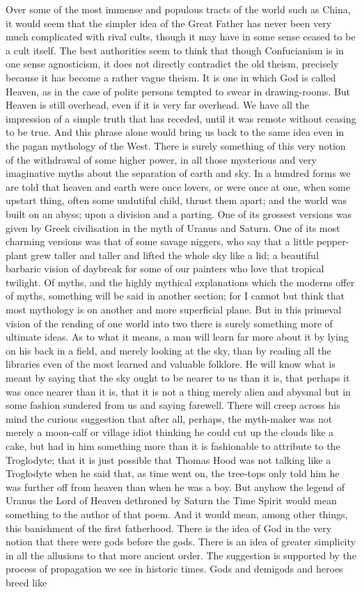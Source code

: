 Over some of the most immense and populous tracts of the world such as China, it would seem that the simpler idea of the Great Father has never been very much complicated with rival cults, though it may have in some sense ceased to be a cult itself. The best authorities seem to think that though Confucianism is in one sense agnosticism, it does not directly contradict the old theism, precisely because it has become a rather vague theism. It is one in which God is called Heaven, as in the case of polite persons tempted to swear in drawing-rooms. But Heaven is still overhead, even if it is very far overhead. We have all the impression of a simple truth that has receded, until it was remote without ceasing to be true. And this phrase alone would bring us back to the same idea even in the pagan mythology of the West. There is surely something of this very notion of the withdrawal of some higher power, in all those mysterious and very imaginative myths about the separation of earth and sky. In a hundred forms we are told that heaven and earth were once lovers, or were once at one, when some upstart thing, often some undutiful child, thrust them apart; and the world was built on an abyss; upon a division and a parting. One of its grossest versions was given by Greek civilisation in the myth of Uranus and Saturn. One of its most charming versions was that of some savage niggers, who say that a little pepper-plant grew taller and taller and lifted the whole sky like a lid; a beautiful barbaric vision of daybreak for some of our painters who love that tropical twilight. Of myths, and the highly mythical explanations which the moderns offer of myths, something will be said in another section; for I cannot but think that most mythology is on another and more superficial plane. But in this primeval vision of the rending of one world into two there is surely something more of ultimate ideas. As to what it means, a man will learn far more about it by lying on his back in a field, and merely looking at the sky, than by reading all the libraries even of the most learned and valuable folklore. He will know what is meant by saying that the sky ought to be nearer to us than it is, that perhaps it was once nearer than it is, that it is not a thing merely alien and abysmal but in some fashion sundered from us and saying farewell. There will creep across his mind the curious suggestion that after all, perhaps, the myth-maker was not merely a moon-calf or village idiot thinking he could cut up the clouds like a cake, but had in him something more than it is fashionable to attribute to the Troglodyte; that it is just possible that Thomas Hood was not talking like a Troglodyte when he said that, as time went on, the tree-tops only told him he was further off from heaven than when he was a boy. But anyhow the legend of Uranus the Lord of Heaven dethroned by Saturn the Time Spirit would mean something to the author of that poem. And it would mean, among other things, this banishment of the first fatherhood. There is the idea of God in the very notion that there were gods before the gods. There is an idea of greater simplicity in all the allusions to that more ancient order. The suggestion is supported by the process of propagation we see in historic times. Gods and demigods and heroes breed like 